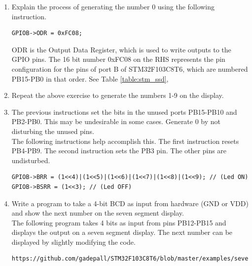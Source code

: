 \documentclass[journal,12pt,twocolumn]{IEEEtran}
\renewcommand\thesection{\arabic{section}}
\renewcommand\thesubsection{\thesection.\arabic{subsection}}
\begin{document}
\begin{enumerate}[label=\thesubsection.\arabic*.,ref=\thesubsection.\theenumi]
\item Explain the process of generating the number 0 using the following instruction.
\begin{lstlisting}
GPIOB->ODR = 0xFC08;
\end{lstlisting}
\solution ODR is the Output Data Register, which is used to write outputs to the GPIO pins. The 16 bit number 0xFC08 on the RHS represents the pin configuration for the pins of port B of STM32F103C8T6, which are numbered PB15-PB0 in that order.  See Table \ref{table:stm_ssd}, 
\\
\item Repeat the above exercise to generate the numbers 1-9 on the display.
\item The previous instructions set the bits in the unused ports PB15-PB10 and PB2-PB0. This may be undesirable in some cases. Generate 0 by not disturbing 
the unused pins.
\\
\solution The following instructions help accomplish this. The first instruction resets PB4-PB9.  The second instruction sets the PB3 pin. The other pins are
undisturbed.
\begin{lstlisting}
GPIOB->BRR = (1<<4)|(1<<5)|(1<<6)|(1<<7)|(1<<8)|(1<<9); // (Led ON)		
GPIOB->BSRR = (1<<3); // (Led OFF)					
\end{lstlisting}
%
%
\item Write a program to take a 4-bit BCD as input from hardware (GND or VDD) and show the next number on the seven segment display.
\\
\solution The following program takes 4 bits as input from pins PB12-PB15 and displays the output on a seven segment display. The next number
can be displayed by slightly modifying the code.
\begin{lstlisting}
https://github.com/gadepall/STM32F103C8T6/blob/master/examples/sevenseg/bin2dec_example.c
\end{lstlisting}
\end{enumerate}
\end{document}
